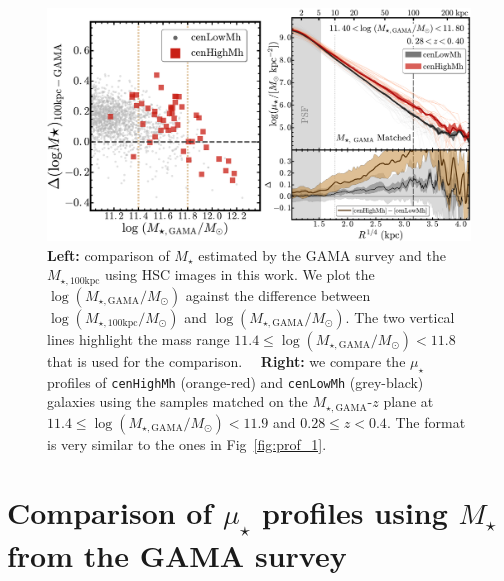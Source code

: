 \documentclass[a4paper,fleqn,usenatbib]{mnras}
\def\rbcg{\texttt{cenHighMh}}
\def\nbcg{\texttt{cenLowMh}}
\def\mstar{{$M_{\star}$}}
\def\mtot{{$M_{\star,100\mathrm{kpc}}$}}
\def\mgama{{$M_{\star,\mathrm{GAMA}}$}}
\def\logmtot{{$\log (M_{\star,100\mathrm{kpc}}/M_{\odot})$}}
\def\logmgama{{$\log (M_{\star,\mathrm{GAMA}}/M_{\odot})$}}
\def\mden{{$\mu_{\star}$}}
\begin{document}
\begin{figure}
    \centering
    \includegraphics[width=16cm]{fig/redbcg_prof_gama_new}
    \caption{
        \textbf{Left:} comparison of \mstar{} estimated by the GAMA survey and 
        the \mtot{} using HSC images in this work. 
        We plot the \logmgama{} against the difference between \logmtot{} and \logmgama{}. 
        The two vertical lines highlight the mass range $11.4 \leq$\logmgama{}$<11.8$ 
        that is used for the comparison.~~
        \textbf{Right:} we compare the \mden{} profiles of \rbcg{} (orange-red) and 
        \nbcg{} (grey-black) galaxies using the samples matched on the 
        \mgama{}-$z$ plane at $11.4 \leq$\logmgama{}$<11.9$ and $0.28 \leq z < 0.4$. 
        The format is very similar to the ones in Fig~\ref{fig:prof_1}.}
    \label{fig:gama}
\end{figure}


\section{Comparison of \mden{} profiles using \mstar{} from the GAMA survey}
    \label{app:gama} 
\end{document}
